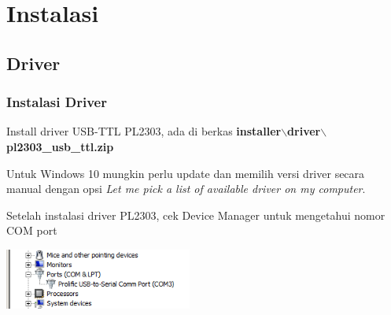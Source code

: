 \documentclass[table,dvipsnames]{beamer}
\begin{document}
	\section{Instalasi}
	\subsection{Driver}
	\begin{frame}
		\frametitle{Instalasi Driver}
		\begin{exampleblock}{}
			Install driver USB-TTL PL2303, ada di berkas \textbf{installer$\backslash$driver$\backslash$pl2303\_usb\_ttl.zip}
		\end{exampleblock}

		\begin{exampleblock}{}
			Untuk Windows 10 mungkin perlu update dan memilih versi driver secara manual dengan opsi
			\textit{Let me pick a list of available driver on my computer}.
		\end{exampleblock}

		\begin{exampleblock}{}
			Setelah instalasi driver PL2303, cek Device Manager untuk mengetahui nomor COM port
		\end{exampleblock}

		\begin{center}
			\includegraphics[width=175pt]{images/comport}
		\end{center}
	\end{frame}
\end{document}
